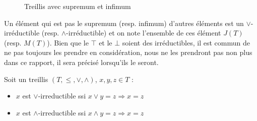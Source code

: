 \begin{figure}[H]
	\begin{minipage}{0.5\textwidth}
	\begin{center}
	\end{center}
	\end{minipage}
	\begin{minipage}{0.5\textwidth}
	\begin{center}
	\end{center}
	\end{minipage}
	\caption{Treillis avec supremum et infimum}
	\label{treillis_sup_inf}
\end{figure}

Un élément qui est pas le supremum (resp. infimum) d'autres éléments est un $\vee$-irréductible (resp. $\wedge$-irréductible) et on note l'ensemble de ces élément $J(T)$ (resp. $M(T)$). Bien que le $\top$ et le $\bot$ soient des irréductibles, il est commun de ne pas toujours les prendre en considération, nous ne les prendront pas non plus dans ce rapport, il sera précisé lorsqu'ils le seront.

\begin{definition}
Soit un treillis $(T, \leq, \vee, \wedge)$, $x, y, z \in T$ :
\begin{itemize}
	\item $x$ est $\vee$-irreductible ssi $x \vee y = z \Rightarrow x = z$
	\item $x$ est $\wedge$-irreductible ssi $x \wedge y = z \Rightarrow x = z$
\end{itemize}
\end{definition}

